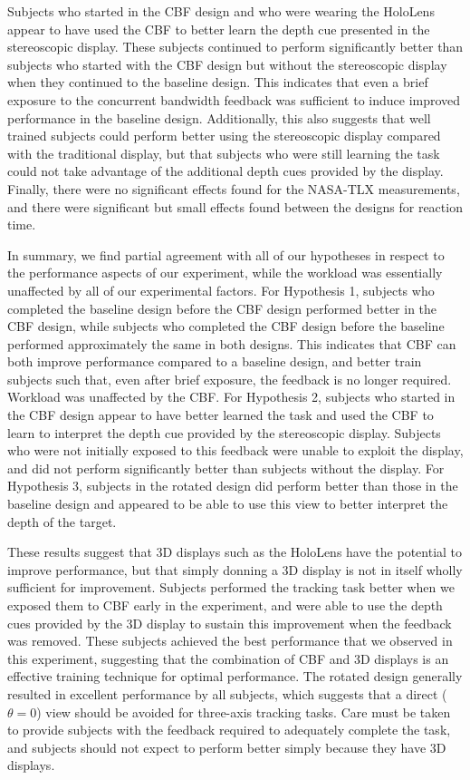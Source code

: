 Subjects who started in the CBF design and who were wearing the HoloLens appear to have used the CBF to better learn the depth cue presented in the stereoscopic display.
These subjects continued to perform significantly better than subjects who started with the CBF design but without the stereoscopic display when they continued to the baseline design.
This indicates that even a brief exposure to the concurrent bandwidth feedback was sufficient to induce improved performance in the baseline design.
Additionally, this also suggests that well trained subjects could perform better using the stereoscopic display compared with the traditional display, but that subjects who were still learning the task could not take advantage of the additional depth cues provided by the display.
Finally, there were no significant effects found for the NASA-TLX measurements, and there were significant but small effects found between the designs for reaction time.

In summary, we find partial agreement with all of our hypotheses in respect to the performance aspects of our experiment, while the workload was essentially unaffected by all of our experimental factors.
For Hypothesis 1, subjects who completed the baseline design before the CBF design performed better in the CBF design, while subjects who completed the CBF design before the baseline performed approximately the same in both designs.
This indicates that CBF can both improve performance compared to a baseline design, and better train subjects such that, even after brief exposure, the feedback is no longer required.
Workload was unaffected by the CBF.
For Hypothesis 2, subjects who started in the CBF design appear to have better learned the task and used the CBF to learn to interpret the depth cue provided by the stereoscopic display.
Subjects who were not initially exposed to this feedback were unable to exploit the display, and did not perform significantly better than subjects without the display.
For Hypothesis 3, subjects in the rotated design did perform better than those in the baseline design and appeared to be able to use this view to better interpret the depth of the target.

These results suggest that 3D displays such as the HoloLens have the potential to improve performance, but that simply donning a 3D display is not in itself wholly sufficient for improvement.
Subjects performed the tracking task better when we exposed them to CBF early in the experiment, and were able to use the depth cues provided by the 3D display to sustain this improvement when the feedback was removed.
These subjects achieved the best performance that we observed in this experiment, suggesting that the combination of CBF and 3D displays is an effective training technique for optimal performance.
The rotated design generally resulted in excellent performance by all subjects, which suggests that a direct ($\theta=0$) view should be avoided for three-axis tracking tasks.
Care must be taken to provide subjects with the feedback required to adequately complete the task, and subjects should not expect to perform better simply because they have 3D displays.

